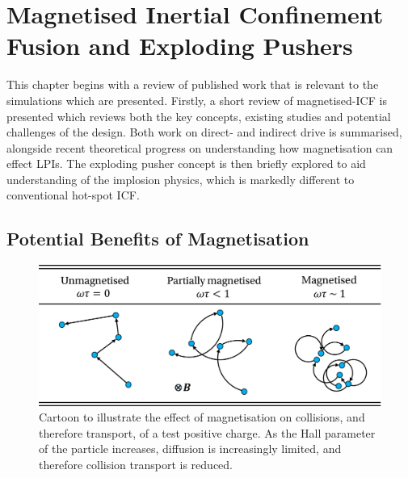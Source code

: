 \newpage

\section{Magnetised Inertial Confinement Fusion and Exploding Pushers}%
\label{sec:Res2_MagICF}

This chapter begins with a review of published work that is relevant to the simulations which are presented.
Firstly, a short review of magnetised-\ac{ICF} is presented which reviews both the key concepts, existing studies and potential challenges of the design.
Both work on direct- and indirect drive is summarised, alongside recent theoretical progress on understanding how magnetisation can effect \ac{LPIs}.
The exploding pusher concept is then briefly explored to aid understanding of the implosion physics, which is markedly different to conventional hot-spot \ac{ICF}.

\subsection{Potential Benefits of Magnetisation}%
\label{sec:Res2_magbenefits}


\begin{figure}[t!]
    \includegraphics[width=0.75\linewidth]{Results2/Images/wt_collisions.png}
    \centering
    \caption{Cartoon to illustrate the effect of magnetisation on collisions, and therefore transport, of a test positive charge.
    As the Hall parameter of the particle increases, diffusion is increasingly limited, and therefore collision transport is reduced.}%
    \label{fig:Res2_Bose_magp2}
\end{figure}

